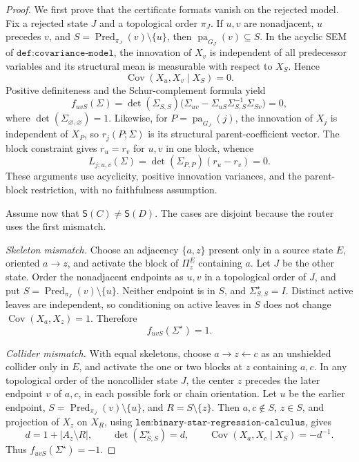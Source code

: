 \documentclass{article}
\begin{document}
\begin{proof}
We first prove that the certificate formats vanish on the rejected model.  Fix a rejected state \(J\) and a topological order \(\pi_J\).  If \(u,v\) are nonadjacent, \(u\) precedes \(v\), and \(S=\operatorname{Pred}_{\pi_J}(v)\setminus\{u\}\), then \(\operatorname{pa}_{G_J}(v)\subseteq S\).  In the acyclic SEM of \(\texttt{def:covariance-model}\), the innovation of \(X_v\) is independent of all predecessor variables and its structural mean is measurable with respect to \(X_S\).  Hence
\[
 \operatorname{Cov}(X_u,X_v\mid X_S)=0.
\]
Positive definiteness and the Schur-complement formula yield
\[
 f_{uvS}(\Sigma)=\det(\Sigma_{S,S})
 \bigl(\Sigma_{uv}-\Sigma_{uS}\Sigma_{S,S}^{-1}\Sigma_{Sv}\bigr)=0,
\]
where \(\det(\Sigma_{\varnothing,\varnothing})=1\).  Likewise, for \(P=\operatorname{pa}_{G_J}(j)\), the innovation of \(X_j\) is independent of \(X_P\), so \(r_j(P;\Sigma)\) is its structural parent-coefficient vector.  The block constraint gives \(r_u=r_v\) for \(u,v\) in one block, whence
\[
 L_{j;u,v}(\Sigma)=\det(\Sigma_{P,P})(r_u-r_v)=0.
\]
These arguments use acyclicity, positive innovation variances, and the parent-block restriction, with no faithfulness assumption.

Assume now that \(\mathsf S(C)\ne\mathsf S(D)\).  The cases are disjoint because the router uses the first mismatch.

\emph{Skeleton mismatch.}
Choose an adjacency \(\{a,z\}\) present only in a source state \(E\), oriented \(a\to z\), and activate the block of \(\Pi^E_z\) containing \(a\).  Let \(J\) be the other state.  Order the nonadjacent endpoints as \(u,v\) in a topological order of \(J\), and put \(S=\operatorname{Pred}_{\pi_J}(v)\setminus\{u\}\).  Neither endpoint is in \(S\), and \(\Sigma^{\star}_{S,S}=I\).  Distinct active leaves are independent, so conditioning on active leaves in \(S\) does not change \(\operatorname{Cov}(X_a,X_z)=1\).  Therefore
\[
 f_{uvS}(\Sigma^{\star})=1.
\]

\emph{Collider mismatch.}
With equal skeletons, choose \(a\to z\leftarrow c\) as an unshielded collider only in \(E\), and activate the one or two blocks at \(z\) containing \(a,c\).  In any topological order of the noncollider state \(J\), the center \(z\) precedes the later endpoint \(v\) of \(a,c\), in each possible fork or chain orientation.  Let \(u\) be the earlier endpoint, \(S=\operatorname{Pred}_{\pi_J}(v)\setminus\{u\}\), and \(R=S\setminus\{z\}\).  Then \(a,c\notin S\), \(z\in S\), and projection of \(X_z\) on \(X_R\), using \(\texttt{lem:binary-star-regression-calculus}\), gives
\[
 d=1+|A_z\setminus R|,\qquad
 \det(\Sigma^{\star}_{S,S})=d,\qquad
 \operatorname{Cov}(X_a,X_c\mid X_S)=-d^{-1}.
\]
Thus \(f_{uvS}(\Sigma^{\star})=-1\).


\end{proof}
\end{document}
